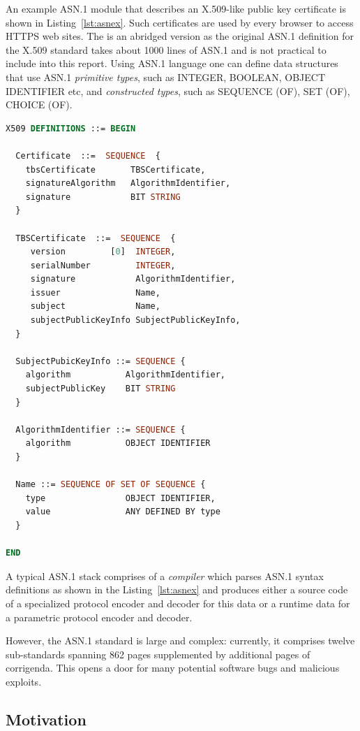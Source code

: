 \documentclass[acmsmall,nonacm]{acmart}
\begin{document}
An example ASN.1 module that describes an X.509-like public key
certificate is shown in Listing~\ref{lst:asnex}. Such certificates are
used by every browser to access HTTPS web sites. The is an abridged
version as the original ASN.1 definition for the X.509 standard takes
about 1000 lines of ASN.1 and is not practical to include into this
report. Using ASN.1 language one can define data structures that use
ASN.1 {\it primitive types}, such as INTEGER, BOOLEAN, OBJECT
IDENTIFIER etc, and {\it constructed types}, such as SEQUENCE (OF),
SET (OF), CHOICE (OF).

\begin{lstlisting}[language=ASN1,label=lst:asnex,
  caption={ASN.1 example of X.509 certificates, adapted for brevity}]
X509 DEFINITIONS ::= BEGIN

  Certificate  ::=  SEQUENCE  {
    tbsCertificate       TBSCertificate,
    signatureAlgorithm   AlgorithmIdentifier,
    signature            BIT STRING
  }

  TBSCertificate  ::=  SEQUENCE  {
     version         [0]  INTEGER,
     serialNumber         INTEGER,
     signature            AlgorithmIdentifier,
     issuer               Name,
     subject              Name,
     subjectPublicKeyInfo SubjectPublicKeyInfo,
  }

  SubjectPubicKeyInfo ::= SEQUENCE {
    algorithm           AlgorithmIdentifier,
    subjectPublicKey    BIT STRING
  }

  AlgorithmIdentifier ::= SEQUENCE {
    algorithm           OBJECT IDENTIFIER
  }

  Name ::= SEQUENCE OF SET OF SEQUENCE {
    type                OBJECT IDENTIFIER,
    value               ANY DEFINED BY type
  }

END
\end{lstlisting}


A typical ASN.1 stack comprises of a \textit{compiler} which parses
ASN.1 syntax definitions as shown in the Listing~\ref{lst:asnex} and
produces either a source code of a specialized protocol encoder and
decoder for this data or a runtime data for a parametric protocol
encoder and decoder.

However, the ASN.1 standard \cite{ASN1Intro} is large and complex:
currently, it comprises twelve sub-standards spanning 862 pages
supplemented by additional pages of corrigenda\cite{ASN1Intro}. This opens
a door for many potential software bugs and malicious exploits.
  
\subsection{Motivation}
\end{document}
